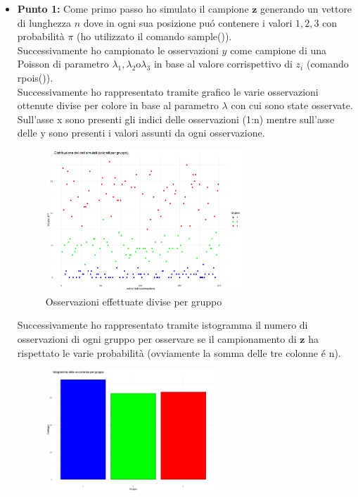 \documentclass[a4paper,12pt]{article}
\begin{document}
	\begin{itemize}
		\item \textbf{Punto 1:}
		Come primo passo ho simulato il campione $\textbf{z}$ generando un vettore di lunghezza $n$ dove in ogni sua posizione puó contenere i valori $1,2,3$ con probabilità $\pi$ (ho utilizzato il comando sample()). \\
		Successivamente ho campionato le osservazioni $y$ come campione di una Poisson di parametro $\lambda_1,\lambda_2 \text{o}\lambda_3$ in base al valore corrispettivo di $z_i$ (comando rpois()).\\
		Successivamente ho rappresentato tramite grafico le varie osservazioni ottenute divise per colore in base al parametro $\lambda$ con cui sono state osservate. Sull'asse x  sono presenti gli indici delle osservazioni (1:n) mentre sull'asse delle y sono presenti i valori assunti da ogni osservazione.\\
		\begin{figure}[h] %
			\centering %
			\includegraphics[width=0.7\textwidth]{scatter_oss_pois.png} %
			\caption{Osservazioni effettuate divise per gruppo} %
			\label{fig:immagine} %
		\end{figure}
		\newpage
		Successivamente ho rappresentato tramite istogramma il numero di osservazioni di ogni gruppo per osservare se il campionamento di $\textbf{z}$ ha rispettato le varie probabilità (ovviamente la somma delle tre colonne é n).
		\begin{figure}[h] %
			\centering %
			\includegraphics[width=0.6\textwidth]{isto.png} %

\end{figure}
\end{itemize}
\end{document}
